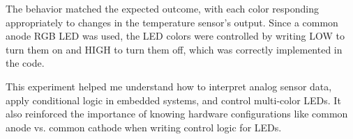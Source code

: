 The behavior matched the expected outcome, with each color
responding appropriately to changes in the temperature sensor’s output.
Since a common anode RGB LED was used, the LED colors were controlled
by writing LOW to turn them on and HIGH to turn them off, which was
correctly implemented in the code.

This experiment helped me understand how to interpret analog sensor data,
apply conditional logic in embedded systems, and control multi-color LEDs.
It also reinforced the importance of knowing hardware configurations
like common anode vs. common cathode when writing control logic for LEDs.

